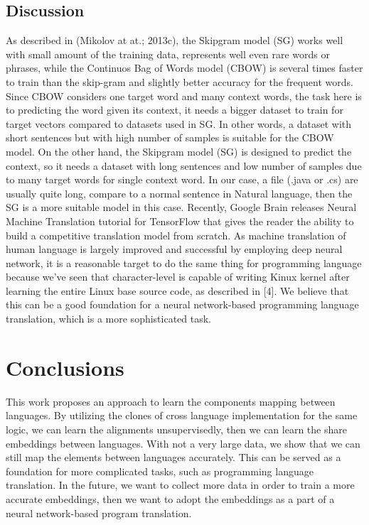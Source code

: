 \subsection{Discussion}
As described in (Mikolov at at.; 2013c), the Skipgram model (SG) works well with small amount of the training data, represents well even rare words or phrases, while the Continuos Bag of Words model (CBOW) is several times faster to train than the skip-gram and slightly better accuracy for the frequent words. Since CBOW considers one target word and many context words, the task here is to predicting the word given its context, it needs a bigger dataset to train for target vectors compared to datasets used in SG. In other words, a dataset with short sentences but with high number of samples is suitable for the CBOW model. On the other hand, the Skipgram model (SG) is designed to predict the context, so it needs a dataset with long sentences and low number of samples due to many target words for single context word. In our case, a file (.java or .cs) are usually quite long, compare to a normal sentence in Natural language, then the SG is a more suitable model in this case. 
Recently, Google Brain releases Neural Machine Translation tutorial for TensorFlow that gives the reader the ability to build a competitive translation model from scratch. As machine translation of human language is largely improved and successful by employing deep neural network, it is a reasonable target to do the same thing for programming language because we've seen that character-level is capable of writing Kinux kernel after learning the entire Linux base source code, as described in [4]. We believe that this can be a good foundation for a neural network-based programming language translation, which is a more sophisticated task. 

\section{Conclusions}
This work proposes an approach to learn the components mapping between languages. By utilizing the clones of cross language implementation for the same logic, we can learn the alignments unsupervisedly, then we can learn the share embeddings between languages. With not a very large data, we show that we can still map the elements between languages accurately. This can be served as a foundation for more complicated tasks, such as programming language translation. In the future, we want to collect more data in order to train a more accurate embeddings, then we want to adopt the embeddings as a part of a neural network-based program translation.



\begin{acks}

\end{acks}

